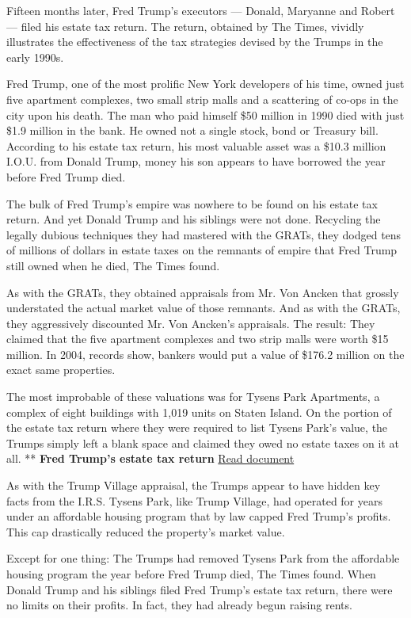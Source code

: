Fifteen months later, Fred Trump's executors --- Donald, Maryanne and
Robert --- filed his estate tax return. The return, obtained by The
Times, vividly illustrates the effectiveness of the tax strategies
devised by the Trumps in the early 1990s.

Fred Trump, one of the most prolific New York developers of his time,
owned just five apartment complexes, two small strip malls and a
scattering of co-ops in the city upon his death. The man who paid
himself \$50 million in 1990 died with just \$1.9 million in the bank.
He owned not a single stock, bond or Treasury bill. According to his
estate tax return, his most valuable asset was a \$10.3 million I.O.U.
from Donald Trump, money his son appears to have borrowed the year
before Fred Trump died.

The bulk of Fred Trump's empire was nowhere to be found on his estate
tax return. And yet Donald Trump and his siblings were not done.
Recycling the legally dubious techniques they had mastered with the
GRATs, they dodged tens of millions of dollars in estate taxes on the
remnants of empire that Fred Trump still owned when he died, The Times
found.

As with the GRATs, they obtained appraisals from Mr. Von Ancken that
grossly understated the actual market value of those remnants. And as
with the GRATs, they aggressively discounted Mr. Von Ancken's
appraisals. The result: They claimed that the five apartment complexes
and two strip malls were worth \$15 million. In 2004, records show,
bankers would put a value of \$176.2 million on the exact same
properties.

The most improbable of these valuations was for Tysens Park Apartments,
a complex of eight buildings with 1,019 units on Staten Island. On the
portion of the estate tax return where they were required to list Tysens
Park's value, the Trumps simply left a blank space and claimed they owed
no estate taxes on it at all. ** \textbf{Fred Trump's estate tax return}
\href{https://int.nyt.com/data/documenthelper/209-fct-federal-estate-tax-return/37760d2a7b28b983e8ce/optimized/full.pdf\#page=1}{Read
document}

As with the Trump Village appraisal, the Trumps appear to have hidden
key facts from the I.R.S. Tysens Park, like Trump Village, had operated
for years under an affordable housing program that by law capped Fred
Trump's profits. This cap drastically reduced the property's market
value.

Except for one thing: The Trumps had removed Tysens Park from the
affordable housing program the year before Fred Trump died, The Times
found. When Donald Trump and his siblings filed Fred Trump's estate tax
return, there were no limits on their profits. In fact, they had already
begun raising rents.

